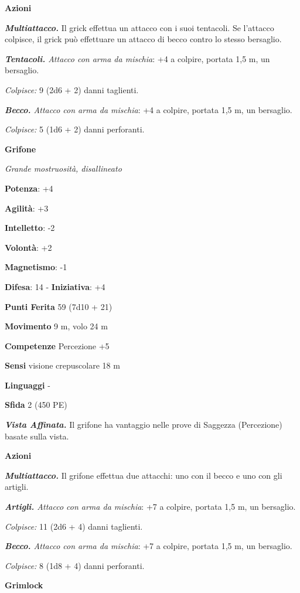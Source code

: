 \begin{multicols}{2}
\textbf{Azioni}

\emph{\textbf{Multiattacco.}} Il grick effettua un attacco con i suoi
tentacoli. Se l'attacco colpisce, il grick può effettuare un attacco di
becco contro lo stesso bersaglio.

\emph{\textbf{Tentacoli.} Attacco con arma da mischia}: +4 a colpire,
portata 1,5 m, un bersaglio.

\emph{Colpisce:} 9 (2d6 + 2) danni taglienti.

\emph{\textbf{Becco.} Attacco con arma da mischia}: +4 a colpire,
portata 1,5 m, un bersaglio.

\emph{Colpisce:} 5 (1d6 + 2) danni perforanti.



\textbf{Grifone}

\emph{Grande mostruosità, disallineato}

\textbf{Potenza}: +4

\textbf{Agilità}: +3

\textbf{Intelletto}: -2

\textbf{Volontà}: +2

\textbf{Magnetismo}: -1

\textbf{Difesa}: 14 - \textbf{Iniziativa}: +4

\textbf{Punti Ferita} 59 (7d10 + 21)

\textbf{Movimento} 9 m, volo 24 m

\textbf{Competenze} Percezione +5

\textbf{Sensi} visione crepuscolare 18 m

\textbf{Linguaggi} -

\textbf{Sfida} 2 (450 PE)

\emph{\textbf{Vista Affinata.}} Il grifone ha vantaggio nelle prove di
Saggezza (Percezione) basate sulla vista.

\textbf{Azioni}

\emph{\textbf{Multiattacco.}} Il grifone effettua due attacchi: uno con
il becco e uno con gli artigli.

\emph{\textbf{Artigli.} Attacco con arma da mischia}: +7 a colpire,
portata 1,5 m, un bersaglio.

\emph{Colpisce:} 11 (2d6 + 4) danni taglienti.

\emph{\textbf{Becco.} Attacco con arma da mischia}: +7 a colpire,
portata 1,5 m, un bersaglio.

\emph{Colpisce:} 8 (1d8 + 4) danni perforanti.

\textbf{Grimlock}


\end{multicols}
